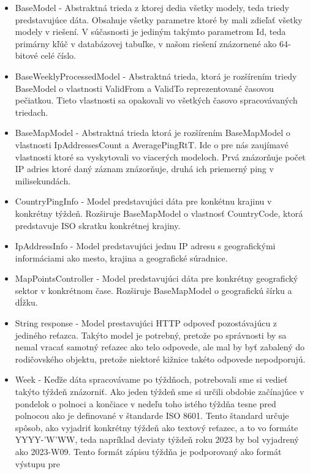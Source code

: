 \begin{itemize}
    \item BaseModel
    - Abstraktná trieda z ktorej dedia všetky modely, teda triedy predstavujúce dáta. Obsahuje všetky parametre ktoré by mali zdieľať všetky modely v riešení. V súčasnosti 
    je jediným takýmto parametrom Id, teda primárny kľúč v databázovej tabuľke, v našom riešení znázornené ako 64-bitové celé číslo.
    \item BaseWeeklyProcessedModel
    - Abstraktná trieda, ktorá je rozšírením triedy BaseModel o vlastnosti ValidFrom a ValidTo reprezentované časovou pečiatkou. Tieto vlastnosti 
    sa opakovali vo všetkých časovo spracovávaných triedach.
    \item BaseMapModel 
    - Abstraktná trieda ktorá je rozšírením BaseMapModel o vlastnosti IpAddressesCount a AveragePingRtT. Ide o pre nás zaujímavé vlastnosti ktoré sa vyskytovali vo 
    viacerých modeloch. Prvá znázorňuje počet IP adries ktoré daný záznam znázorňuje, druhá ich priemerný ping v milisekundách.
    \item CountryPingInfo
    - Model predstavujúci dáta pre konkétnu krajinu v konkrétny týždeň. Rozširuje BaseMapModel o vlastnosť CountryCode, ktorá predstavuje ISO skratku konkrétnej
    krajiny.
    \item IpAddressInfo
    - Model predstavujúci jednu IP adresu s geografickými informáciami ako mesto, krajina a geografické súradnice.
    \item MapPointsController
    - Model predstavujúci dáta pre konkrétny geografický sektor v konkrétnom čase. Rozširuje BaseMapModel o geografickú šírku a dĺžku.
    \item String response
    - Model prestavujúci HTTP odpoveď pozostávajúcu z jediného reťazca. Takýto model je potrebný, pretože po správnosti by sa nemal vracať 
    samotný reťazec ako telo odpovede, ale mal by byť zabalený do rodičovského objektu, pretože niektoré kižnice takéto odpovede nepodporujú.
    \item Week
    - Keďže dáta spracovávame po týždňoch, potrebovali sme si vedieť takýto týždeň znázorniť. Ako jeden týždeň sme si určili obdobie začínajúce v pondelok o polnoci a končiace 
    v nedeľu toho istého týždňa tesne pred polnocou ako je definované v štandarde ISO 8601. Tento štandard určuje spôsob, ako vyjadriť konkrétny týždeň ako textový reťazec, 
    a to vo formáte YYYY-'W'WW, teda napríklad deviaty týždeň roku 2023 by bol vyjadrený ako 2023-W09. Tento formát zápisu týždňa je podporovaný ako formát výstupu pre 

\end{itemize}
